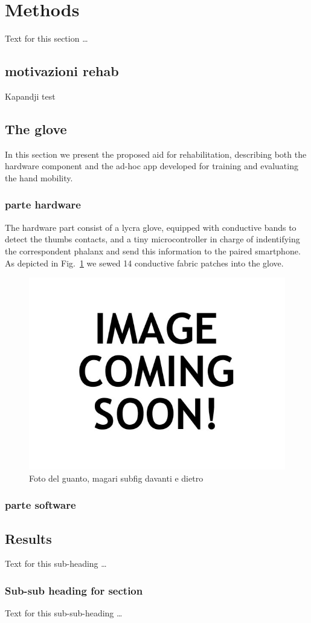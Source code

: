 \documentclass{bmcart}
\newcommand{\fig}{Fig.~}
\begin{document}
\section*{Methods}
Text for this section \ldots
\subsection*{motivazioni rehab}
Kapandji test 
\subsection*{The glove}
In this section we present the proposed aid for rehabilitation, describing both the hardware component and the ad-hoc app developed for training and evaluating the hand mobility.
\subsubsection*{parte hardware}
The hardware part consist of a lycra glove, equipped with conductive bands to detect the thumbs contacts, and a tiny microcontroller in charge of indentifying the correspondent phalanx and send this information to the paired smartphone.
As depicted in \fig\ref{FIG:glove} we sewed 14 conductive fabric patches into the glove. 	

\begin{figure}
\label{FIG:glove}
\includegraphics[width= 3 cm]{./fig/blank.jpg}
\caption{Foto del guanto, magari subfig davanti e dietro}
\end{figure}



\subsubsection*{parte software}

\subsection*{Results}
Text for this sub-heading \ldots
\subsubsection*{Sub-sub heading for section}
Text for this sub-sub-heading \ldots

\end{document}
